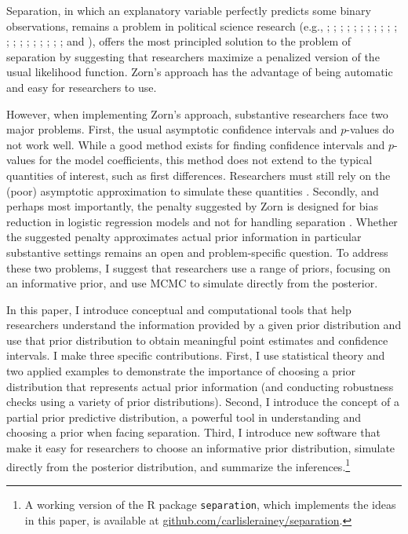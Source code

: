 \documentclass[12pt]{article}
\begin{document}
\newpage
\doublespace

Separation, in which an explanatory variable perfectly predicts some binary observations, remains a problem in political science research (e.g., \citealt{Mares2015}; \citealt{ViningWilhelmCollens2015}; \citealt{BrownKaplow2014}; \citealt{BarrilleauxRainey2014};  \citealt{BellMiller2014}; \citealt{LeemanMares2014}; \citealt{Reiter2014}; \citealt{Weisiger2014}; \citealt{MinozziVolden2013}; \citealt{CedermeanGleditschHug2013}; \citealt{Fuhrmann2012}; \citealt{RoccaSanchezMorin2011}; \citealt{PetersonDrury2011}; \citealt{CoxKousserMcCubbins2010}; \citealt{Ahlquist2010}; \citealt{Rauchhaus2009}; \citealt{SmithFridkin2008}; \citealt{Casellas2008}; \citealt{DesposatoScheiner2008}; \citealt{HellerMershon2008}; and \citealt{DeRouenBercovitch2008}), %
\cite{Zorn2005} offers the most principled solution to the problem of separation by suggesting that researchers maximize a penalized version of the usual likelihood function. Zorn's approach has the advantage of being automatic and easy for researchers to use.

However, when implementing Zorn's approach, substantive researchers face two major problems. First, the usual asymptotic confidence intervals and $p$-values do not work well. While a good method exists for finding confidence intervals and $p$-values for the model coefficients, this method does not extend to the typical quantities of interest, such as first differences. Researchers must still rely on the (poor) asymptotic approximation to simulate these quantities \citep{KingTomzWittenberg2000}.  Secondly, and perhaps most importantly, the penalty suggested by Zorn is designed for bias reduction in logistic regression models and not for handling separation \citep{Firth1993}. Whether the suggested penalty approximates actual prior information in particular substantive settings remains an open and problem-specific question. To address these two problems, I suggest that researchers use a range of priors, focusing on an informative prior, and use MCMC to simulate directly from the posterior.

In this paper, I introduce conceptual and computational tools that help researchers understand the information provided by a given prior distribution and use that prior distribution to obtain meaningful point estimates and confidence intervals. I make three specific contributions. First, I use statistical theory and two applied examples to demonstrate the importance of choosing a prior distribution that represents actual prior information (and conducting robustness checks using a variety of prior distributions). Second, I introduce the concept of a partial prior predictive distribution, a powerful tool in understanding and choosing a prior when facing separation. Third, I introduce new software that make it easy for researchers to choose an informative prior distribution, simulate directly from the posterior distribution, and summarize the inferences.\footnote{A working version of the R package \texttt{separation}, which implements the ideas in this paper, is available at \href{https://github.com/carlislerainey/separation}{github.com/carlislerainey/separation}.}
\end{document}
